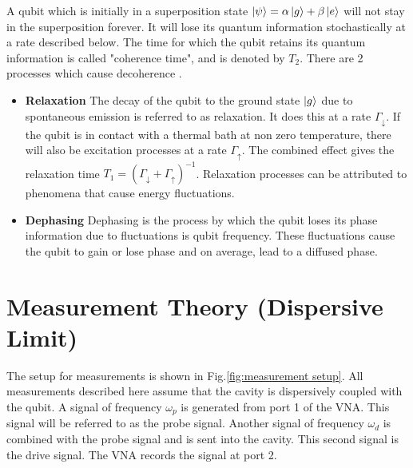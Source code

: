 A qubit which is initially in a superposition state $\ket{\psi} = \alpha\ket{g}+\beta\ket{e}$ will not stay in the superposition forever. It will lose its quantum information stochastically at a rate described below. The time for which the qubit retains its quantum information is called "coherence time", and is denoted by $T_2$. There are 2 processes which cause decoherence \cite{Geerlings2013}.
\begin{itemize}
\item \textbf{Relaxation}
The decay of the qubit to the ground state $\ket{g}$ due to spontaneous emission is referred to as relaxation. It does this at a rate $\Gamma_{\downarrow}$. If the qubit is in contact with a thermal bath at non zero temperature, there will also be excitation processes at a rate $\Gamma_{\uparrow}$. The combined effect gives the relaxation time $T_1 = \left(\Gamma_{\downarrow}+\Gamma_{\uparrow}\right)^{-1}$. Relaxation processes can be attributed to phenomena that cause energy fluctuations.
\item \textbf{Dephasing}
Dephasing is the process by which the qubit loses its phase information due to fluctuations is qubit frequency. These fluctuations cause the qubit to gain or lose phase and on average, lead to a diffused phase.
\end{itemize}

\section{Measurement Theory (Dispersive Limit)}

The setup for measurements is shown in Fig.\ref{fig:measurement setup}. All measurements described here assume that the cavity is dispersively coupled with the qubit. A signal of frequency $\omega_p$ is generated from port 1 of the VNA. This signal will be referred to as the probe signal. Another signal of frequency $\omega_d$ is combined with the probe signal and is sent into the cavity. This second signal is the drive signal. The VNA records the signal at port 2.


